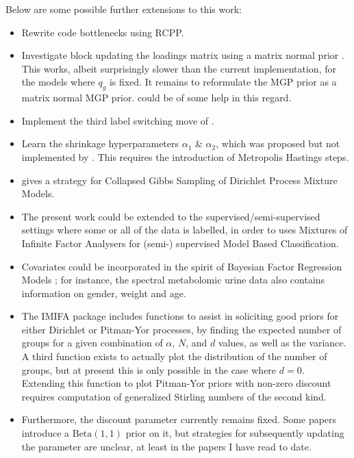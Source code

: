 \documentclass[a4paper,12pt,fleqn]{article}
\newcommand{\pkg}[1]{{\fontseries{b}\selectfont #1}} \newcommand{\diagentry}[1]{\mathmakebox[1.8em]{#1}}
\numberwithin{equation}{section}
\begin{document}
\noindent Below are some possible further extensions to this work:
\begin{itemize}
	\item Rewrite code bottlenecks using \pkg{RCPP}.
	\item Investigate block updating the loadings matrix using a matrix normal prior \citet{Viroli2011}. This works, albeit surprisingly slower than the current implementation, for the models where $q_g$ is fixed. It remains to reformulate the MGP prior as a matrix normal MGP prior. \citet{Bhattacharya2015} could be of some help in this regard.
	\item Implement the third label switching move of \citet{Hastie2014}.
	\item Learn the shrinkage hyperparameters $\alpha_1$ \& $\alpha_2$, which was proposed but not implemented by \citet{Bhattacharya2011}. This requires the introduction of Metropolis Hastings steps.
	\item \citet{Yu2009} gives a strategy for Collapsed Gibbs Sampling of Dirichlet Process Mixture Models.
	\item The present work could be extended to the supervised/semi-supervised settings where some or all of the data is labelled, in order to uses Mixtures of Infinite Factor Analysers for (semi-) supervised Model Based Classification.
	\item Covariates could be incorporated in the spirit of Bayesian Factor Regression Models \citet{West2003, Wang2007, Carvalho2008}; for instance, the spectral metabolomic urine data also contains information on gender, weight and age.
	\item The \pkg{IMIFA} package includes functions to assist in soliciting good priors for either Dirichlet or Pitman-Yor processes, by finding the expected number of groups for a given combination of $\alpha$, $N$, and $d$ values, as well as the variance. A third function exists to actually plot the distribution of the number of groups, but at present this is only possible in the case where $d=0$. Extending this function to plot Pitman-Yor priors with non-zero discount requires computation of generalized Stirling numbers of the second kind.
	\item Furthermore, the discount parameter currently remains fixed. Some papers introduce a $\textrm{Beta}\left(1, 1\right)$ prior on it, but strategies for subsequently updating the parameter are unclear, at least in the papers I have read to date.

\end{itemize}
\end{document}
